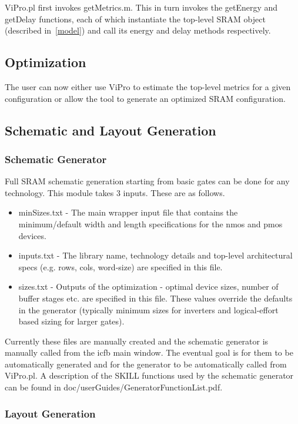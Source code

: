ViPro.pl first invokes getMetrics.m. This in turn invokes the getEnergy and getDelay functions, each of which instantiate the top-level SRAM object (described in~\ref{model}) and call its energy and delay methods respectively.

\subsection{Optimization}
The user can now either use ViPro to estimate the top-level metrics for a given configuration or allow the tool to generate an optimized SRAM configuration.

\subsection{Schematic and Layout Generation}
\subsubsection{Schematic Generator}
Full SRAM schematic generation starting from basic gates can be done for any technology. This module takes 3 inputs. These are as follows.
\begin{itemize}
\setlength{\itemsep}{0cm}
\setlength{\parskip}{0cm}
\item minSizes.txt - The main wrapper input file that contains the minimum/default width and length specifications for the nmos and pmos devices.
\item inputs.txt - The library name, technology details and top-level architectural specs (e.g. rows, cols, word-size) are specified in this file. 
\item sizes.txt - Outputs of the optimization - optimal device sizes, number of buffer stages etc. are specified in this file. These values override the defaults in the generator (typically minimum sizes for inverters and logical-effort based sizing for larger gates).
\end{itemize}

Currently these files are manually created and the schematic generator is manually called from the icfb main window. The eventual goal is for them to be automatically generated and for the generator to be automatically called from ViPro.pl. A description of the SKILL functions used by the schematic generator can be found in doc/userGuides/GeneratorFunctionList.pdf. 

\subsubsection{Layout Generation}



